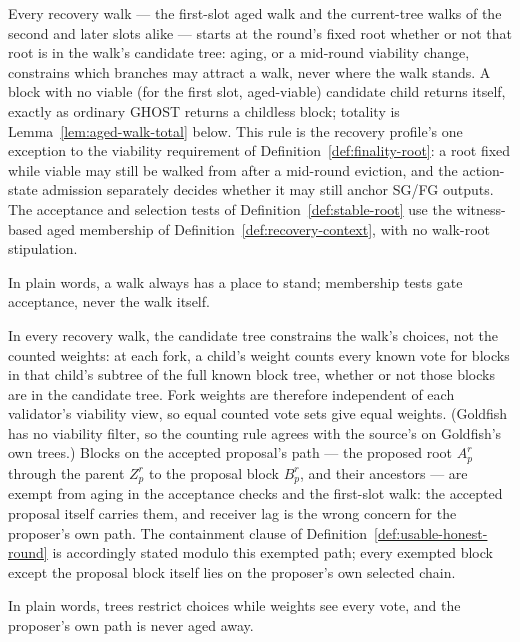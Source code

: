 \begin{definition}
\label{def:walk-standing}
Every recovery walk --- the first-slot aged walk and the current-tree
walks of the second and later slots alike --- starts at the round's
fixed root whether or not that root is in the walk's candidate tree:
aging, or a mid-round viability change, constrains which branches may
attract a walk, never where the walk stands.  A block with no viable
(for the first slot, aged-viable) candidate child returns itself,
exactly as ordinary GHOST returns a childless block; totality is
Lemma~\ref{lem:aged-walk-total} below.  This rule is the recovery
profile's one exception to the viability requirement of
Definition~\ref{def:finality-root}: a root fixed while viable may
still be walked from after a mid-round eviction, and the action-state
admission separately decides whether it may still anchor SG/FG
outputs.  The acceptance and selection tests of
Definition~\ref{def:stable-root} use the witness-based aged
membership of Definition~\ref{def:recovery-context}, with no
walk-root stipulation.

In plain words, a walk always has a place to stand; membership tests
gate acceptance, never the walk itself.
\end{definition}

\begin{definition}
\label{def:counting-rule}
In every recovery walk, the candidate tree constrains the walk's
choices, not the counted weights: at each fork, a child's weight
counts every known vote for blocks in that child's subtree of the full
known block tree, whether or not those blocks are in the candidate
tree.  Fork weights are therefore independent of each validator's
viability view, so equal counted vote sets give equal weights.  (Goldfish has
no viability filter, so the counting rule agrees with the source's on
Goldfish's own trees.)  Blocks on the accepted proposal's path --- the
proposed root \(A_p^r\) through the parent \(Z_p^r\) to the
proposal block \(B_p^r\), and their ancestors --- are exempt from
aging in the acceptance checks and the first-slot walk: the accepted
proposal itself carries them, and receiver lag is the wrong concern
for the proposer's own path.  The containment clause of
Definition~\ref{def:usable-honest-round} is accordingly stated modulo
this exempted path; every exempted block except the proposal block
itself lies on the proposer's own selected chain.

In plain words, trees restrict choices while weights see every vote,
and the proposer's own path is never aged away.
\end{definition}

